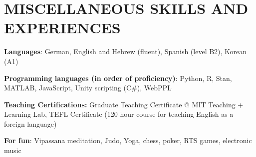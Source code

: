 \documentclass[11pt]{article}
\begin{document}
\section*{MISCELLANEOUS SKILLS AND EXPERIENCES}

\textbf{Languages}: German, English and Hebrew (fluent), Spanish (level B2), Korean (A1) \smallbreak

\textbf{Programming languages (in order of proficiency)}: Python, R, Stan, MATLAB, JavaScript, Unity scripting (C\#), WebPPL \smallbreak

\textbf{Teaching Certifications:} Graduate Teaching Certificate @ MIT Teaching + Learning Lab, TEFL Certificate (120-hour course for teaching English as a foreign language) \smallbreak

\textbf{For fun}: Vipassana meditation, Judo, Yoga, chess, poker, RTS games, electronic music \smallbreak

\vfill %


%

\end{document}
